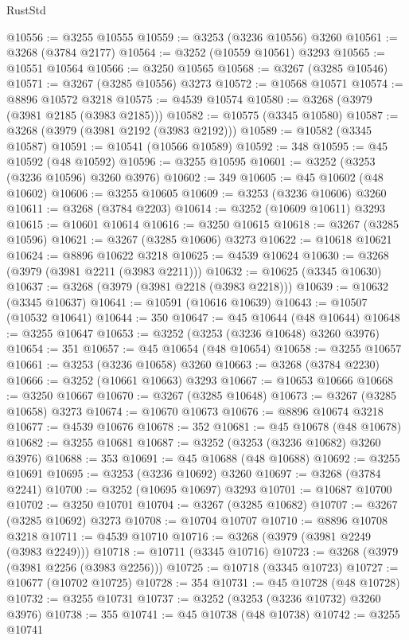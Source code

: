 \begin{lexlean}{RustStd}
\begin{coremodule}
{\begin{coremodule}
{{{{{{{{{{{{{{{{{{{{{{{{{{{{{{{{{{{{{{{@10556 := @3255 @10555
@10559 := @3253 (@3236 @10556) @3260
@10561 := @3268 (@3784 @2177)
@10564 := @3252 (@10559 @10561) @3293
@10565 := @10551 @10564
@10566 := @3250 @10565
@10568 := @3267 (@3285 @10546)
@10571 := @3267 (@3285 @10556) @3273
@10572 := @10568 @10571
@10574 := @8896 @10572 @3218
@10575 := @4539 @10574
@10580 := @3268 (@3979 (@3981 @2185 (@3983 @2185)))
@10582 := @10575 (@3345 @10580)
@10587 := @3268 (@3979 (@3981 @2192 (@3983 @2192)))
@10589 := @10582 (@3345 @10587)
@10591 := @10541 (@10566 @10589)
@10592 := 348
@10595 := @45 @10592 (@48 @10592)
@10596 := @3255 @10595
@10601 := @3252 (@3253 (@3236 @10596) @3260 @3976)
@10602 := 349
@10605 := @45 @10602 (@48 @10602)
@10606 := @3255 @10605
@10609 := @3253 (@3236 @10606) @3260
@10611 := @3268 (@3784 @2203)
@10614 := @3252 (@10609 @10611) @3293
@10615 := @10601 @10614
@10616 := @3250 @10615
@10618 := @3267 (@3285 @10596)
@10621 := @3267 (@3285 @10606) @3273
@10622 := @10618 @10621
@10624 := @8896 @10622 @3218
@10625 := @4539 @10624
@10630 := @3268 (@3979 (@3981 @2211 (@3983 @2211)))
@10632 := @10625 (@3345 @10630)
@10637 := @3268 (@3979 (@3981 @2218 (@3983 @2218)))
@10639 := @10632 (@3345 @10637)
@10641 := @10591 (@10616 @10639)
@10643 := @10507 (@10532 @10641)
@10644 := 350
@10647 := @45 @10644 (@48 @10644)
@10648 := @3255 @10647
@10653 := @3252 (@3253 (@3236 @10648) @3260 @3976)
@10654 := 351
@10657 := @45 @10654 (@48 @10654)
@10658 := @3255 @10657
@10661 := @3253 (@3236 @10658) @3260
@10663 := @3268 (@3784 @2230)
@10666 := @3252 (@10661 @10663) @3293
@10667 := @10653 @10666
@10668 := @3250 @10667
@10670 := @3267 (@3285 @10648)
@10673 := @3267 (@3285 @10658) @3273
@10674 := @10670 @10673
@10676 := @8896 @10674 @3218
@10677 := @4539 @10676
@10678 := 352
@10681 := @45 @10678 (@48 @10678)
@10682 := @3255 @10681
@10687 := @3252 (@3253 (@3236 @10682) @3260 @3976)
@10688 := 353
@10691 := @45 @10688 (@48 @10688)
@10692 := @3255 @10691
@10695 := @3253 (@3236 @10692) @3260
@10697 := @3268 (@3784 @2241)
@10700 := @3252 (@10695 @10697) @3293
@10701 := @10687 @10700
@10702 := @3250 @10701
@10704 := @3267 (@3285 @10682)
@10707 := @3267 (@3285 @10692) @3273
@10708 := @10704 @10707
@10710 := @8896 @10708 @3218
@10711 := @4539 @10710
@10716 := @3268 (@3979 (@3981 @2249 (@3983 @2249)))
@10718 := @10711 (@3345 @10716)
@10723 := @3268 (@3979 (@3981 @2256 (@3983 @2256)))
@10725 := @10718 (@3345 @10723)
@10727 := @10677 (@10702 @10725)
@10728 := 354
@10731 := @45 @10728 (@48 @10728)
@10732 := @3255 @10731
@10737 := @3252 (@3253 (@3236 @10732) @3260 @3976)
@10738 := 355
@10741 := @45 @10738 (@48 @10738)
@10742 := @3255 @10741
}}}}}}}}}}}}}}}}}}}}}}}}}}}}}}}}}}}}}}}
\end{coremodule}}
\end{coremodule}
\end{lexlean}
